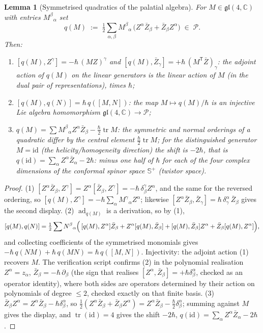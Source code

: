 \documentclass[11pt]{article}
\newtheorem{lemma}[theorem]{Lemma}
\theoremstyle{definition}
\theoremstyle{plain}
\newcommand{\changedmark}[2]{\marginpar{\raggedright\scriptsize\color{#1}#2}}
\providecommand{\C}{}\renewcommand{\C}{\mathbb{C}}
\providecommand{\CS}{}\renewcommand{\CS}{{\mathbb{S}^{+}}}
\begin{document}
\begin{lemma}[Symmetrised quadratics of the palatial algebra]\label{c:correspondence.symmetrised-quadratics-palatial-algebra}
\changedmark{BrickRed}{corrected since the deposit}
For $M \in \mathfrak{gl}(4,\C)$ with entries $M^\beta{}_\alpha$ set
\[
q(M) \;:=\; \tfrac12 \sum_{\alpha,\beta} M^\beta{}_\alpha\,\bigl(Z^\alpha \bar Z_\beta + \bar Z_\beta Z^\alpha\bigr) \;\in\; \mathcal{P}.
\]
Then:
\begin{enumerate}
\item $[q(M), Z^\gamma] = -\hbar\,(MZ)^\gamma$ and $[q(M), \bar Z_\gamma] = +\hbar\,(M^{\mathsf T}\bar Z)_\gamma$: the adjoint action of $q(M)$ on the linear generators is the linear action of $M$ (in the dual pair of representations), times $\hbar$;
\item $[q(M), q(N)] = \hbar\, q([M,N])$: the map $M \mapsto q(M)/\hbar$ is an injective Lie algebra homomorphism $\mathfrak{gl}(4,\C) \to \mathcal{P}$;
\item $q(M) = \sum M^\beta{}_\alpha Z^\alpha \bar Z_\beta - \tfrac{\hbar}{2}\operatorname{tr} M$: the symmetric and normal orderings of a quadratic differ by the central element $\tfrac{\hbar}{2}\operatorname{tr}M$; for the distinguished generator $M = \mathrm{id}$ (the helicity/homogeneity direction) the shift is $-2\hbar$, that is $q(\mathrm{id}) = \sum_\alpha Z^\alpha\bar Z_\alpha - 2\hbar$: minus one half of $\hbar$ for each of the four complex dimensions of the conformal spinor space $\CS$ (twistor space).
\end{enumerate}
\end{lemma}
\begin{proof}
(1) $[Z^\alpha\bar Z_\beta, Z^\gamma] = Z^\alpha[\bar Z_\beta, Z^\gamma] = -\hbar\,\delta^\gamma_\beta Z^\alpha$, and the same for the reversed ordering, so $[q(M), Z^\gamma] = -\hbar\sum_\alpha M^\gamma{}_\alpha Z^\alpha$; likewise $[Z^\alpha \bar Z_\beta, \bar Z_\gamma] = \hbar\,\delta^\alpha_\gamma\,\bar Z_\beta$ gives the second display.
(2) $\operatorname{ad}_{q(M)}$ is a derivation, so by (1),
\[
[q(M), q(N)] = \tfrac12\sum N^\beta{}_\alpha\Bigl(\,[q(M),Z^\alpha]\bar Z_\beta + Z^\alpha[q(M),\bar Z_\beta] + [q(M),\bar Z_\beta]Z^\alpha + \bar Z_\beta[q(M),Z^\alpha]\Bigr),
\]
and collecting coefficients of the symmetrised monomials gives $-\hbar\,q(NM) + \hbar\,q(MN) = \hbar\,q([M,N])$. Injectivity: the adjoint action (1) recovers $M$. The verification script confirms (2) in the polynomial realisation $Z^\alpha = z_\alpha$, $\bar Z_\beta = -\hbar\,\partial_\beta$ (the sign that realises $[Z^\alpha, \bar Z_\beta] = +\hbar\delta^\alpha_\beta$, checked as an operator identity), where both sides are operators determined by their action on polynomials of degree $\le 2$, checked exactly on that finite basis.
(3) $\bar Z_\beta Z^\alpha = Z^\alpha \bar Z_\beta - \hbar\delta^\alpha_\beta$, so $\tfrac12(Z^\alpha\bar Z_\beta + \bar Z_\beta Z^\alpha) = Z^\alpha\bar Z_\beta - \tfrac{\hbar}{2}\delta^\alpha_\beta$; summing against $M$ gives the display, and $\operatorname{tr}(\mathrm{id}) = 4$ gives the shift $-2\hbar$, $q(\mathrm{id}) = \sum_\alpha Z^\alpha\bar Z_\alpha - 2\hbar$.

\end{proof}
\end{document}
